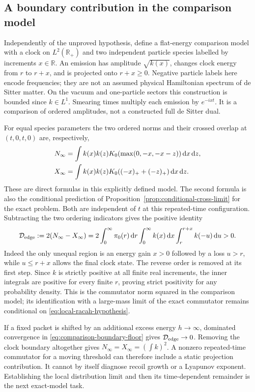 \subsection{A boundary contribution in the comparison model}
Independently of the unproved hypothesis, define a flat-energy comparison
model with a clock on $L^2(\mathbb R_+)$ and two independent particle
species labelled by increments $x\in\mathbb R$. An emission has amplitude
$\sqrt{k(x)}$, changes clock energy from $r$ to $r+x$, and is projected
onto $r+x\ge0$. Negative particle labels here encode frequencies; they
are not an assumed physical Hamiltonian spectrum of de Sitter matter.
On the vacuum and one-particle sectors this construction is bounded
since $k\in L^1$. Smearing times multiply each emission by $e^{-ixt}$.
It is a comparison of ordered amplitudes, not a constructed full
de Sitter dual.

For equal species parameters the two ordered norms and their crossed
overlap at $(t,0,t,0)$ are, respectively,
\begin{align}
 N_\infty&=\int k(x)k(z)
       K_0(\max(0,-x,-x-z))\mathop{}\!\mathrm d x\mathop{}\!\mathrm d z,\notag\\
 X_\infty&=\int k(x)k(z)K_0((-x)_++(-z)_+)\mathop{}\!\mathrm d x\mathop{}\!\mathrm d z.
 \label{eq:comparison-norms}
\end{align}
These are direct formulas in this explicitly defined model.
The second formula is also the conditional prediction of
Proposition~\ref{prop:conditional-cross-limit} for the exact problem.
Both are independent of $t$ at this repeated-time configuration.
Subtracting the two ordering indicators gives the positive identity
\begin{equation}
 \mathcal D_{\rm edge}:=2(N_\infty-X_\infty)
 =2\int_0^\infty\pi_0(r)\mathop{}\!\mathrm d r\int_0^\infty k(x)\mathop{}\!\mathrm d x
                                  \int_r^{r+x}k(-u)\mathop{}\!\mathrm d u>0.
 \label{eq:comparison-boundary-floor}
\end{equation}
Indeed the only unequal region is an energy gain $x>0$ followed by a
loss $u>r$, while $u\le r+x$ allows the final clock state. The reverse
order is removed at its first step. Since $k$ is strictly positive at
all finite real increments, the inner integrals are positive for every
finite $r$, proving strict positivity for any probability density.
This is the commutator norm squared in the comparison model; its
identification with a large-mass limit of the exact commutator remains
conditional on \eqref{eq:local-racah-hypothesis}.

If a fixed packet is shifted by an additional excess energy $h\to\infty$,
dominated convergence in \eqref{eq:comparison-boundary-floor} gives
$\mathcal D_{\rm edge}\to0$. Removing the clock boundary altogether
gives $N_\infty=X_\infty=(\int k)^2$. A nonzero repeated-time
commutator for a moving threshold can therefore include a static
projection contribution. It cannot by itself diagnose recoil growth or
a Lyapunov exponent. Establishing the local distribution limit and then
its time-dependent remainder is the next exact-model task.
